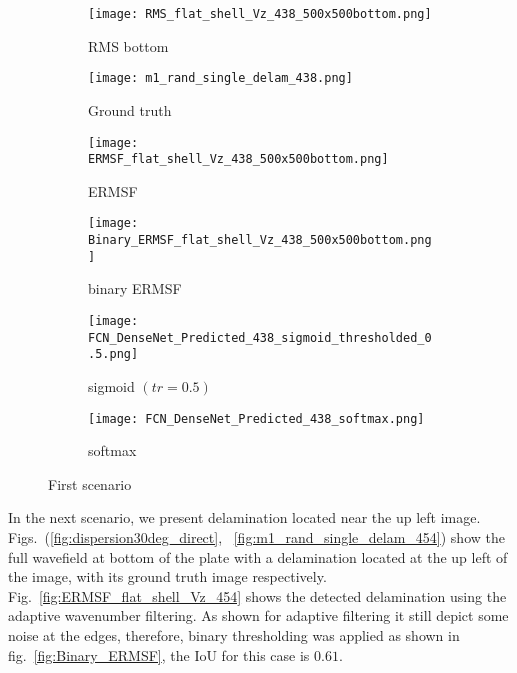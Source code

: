 	\begin{figure} [!h]
		\centering
		\begin{subfigure}[b]{0.47\textwidth}
			\centering
			\texttt{[image: RMS\_flat\_shell\_Vz\_438\_500x500bottom.png]}
			\caption{RMS bottom}
			\label{fig:RMS_flat_shell_Vz_438}
		\end{subfigure}
		\hfill
			\begin{subfigure}[b]{0.47\textwidth}
			\centering
			\texttt{[image: m1\_rand\_single\_delam\_438.png]}
			\caption{Ground truth}
			\label{fig:m1_rand_single_delam_438}
		\end{subfigure}
		\hfill
		\begin{subfigure}[b]{0.47\textwidth}
			\centering
			\texttt{[image: ERMSF\_flat\_shell\_Vz\_438\_500x500bottom.png]}
			\caption{ERMSF}
			\label{fig:ERMSF_flat_shell_Vz_438}
		\end{subfigure}
		\hfill
		\begin{subfigure}[b]{0.47\textwidth}
			\centering
			\texttt{[image: Binary\_ERMSF\_flat\_shell\_Vz\_438\_500x500bottom.png]}
			\caption{binary ERMSF}
			\label{fig:Binary_ERMSF_flat_shell_Vz_438}
		\end{subfigure}
		\hfill
		\begin{subfigure}[b]{0.47\textwidth}
			\centering
		\texttt{[image: FCN\_DenseNet\_Predicted\_438\_sigmoid\_thresholded\_0.5.png]}
		\caption{sigmoid \((tr = 0.5)\)}
		\label{fig:predict_438_sigmoid_tr_0.5}
		\end{subfigure}
		\hfill
		\begin{subfigure}[b]{0.47\textwidth}
			\centering
			\texttt{[image: FCN\_DenseNet\_Predicted\_438\_softmax.png]}
			\caption{softmax}
			\label{fig:predict_438_softmax}
		\end{subfigure}
		\caption{First scenario}
		\label{fig:RMS438}
	\end{figure} 
	In the next scenario, we present delamination located near the up left image.
	Figs.~(\ref{fig:dispersion30deg_direct}, ~\ref{fig:m1_rand_single_delam_454}) show the full wavefield at bottom of the plate with a delamination located at the up left of the image, with its ground truth image respectively.
	Fig.~\ref{fig:ERMSF_flat_shell_Vz_454} shows the detected delamination using the adaptive wavenumber filtering.
	As shown for adaptive filtering it still depict some noise at the edges, therefore, binary thresholding was applied as shown in fig.~\ref{fig:Binary_ERMSF}, the IoU for this case is \(0.61\).
